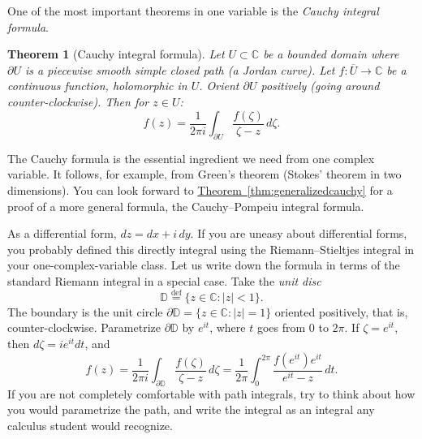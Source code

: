 \documentclass[12pt,openany]{book}
\newcommand{\sabs}[1]{\lvert {#1} \rvert}
\newcommand{\C}{{\mathbb{C}}}
\newcommand{\D}{{\mathbb{D}}}
\newcommand{\myindex}[1]{#1\index{#1}}
\theoremstyle{plain}
\newtheorem{thm}{Theorem}[section]
\theoremstyle{remark}
\theoremstyle{definition}
\theoremstyle{exercise}
\theoremstyle{example}
\newcommand{\thmref}[1]{\hyperref[#1]{Theorem~\ref*{#1}}}
\begin{document}
One of the most important theorems in one variable is
the \emph{\myindex{Cauchy integral formula}}.

\begin{thm}[Cauchy integral formula]
Let $U \subset \C$ be a bounded domain where $\partial U$ is a piecewise smooth
simple closed path (a Jordan curve).  Let $f \colon \overline{U} \to \C$ be a continuous function,
holomorphic in $U$.
Orient $\partial U$ positively (going around counter-clockwise).
Then for $z \in U$:
\begin{equation*}
f(z) =
\frac{1}{2\pi i}
\int_{\partial U}
\frac{f(\zeta)}{\zeta-z}
\,
d \zeta .
\end{equation*}
\end{thm}


The Cauchy formula is the essential ingredient we need from 
one complex variable.  It follows, for example,
from Green's theorem (Stokes' theorem in two
dimensions).  You can look forward to
\thmref{thm:generalizedcauchy} for a proof of a more general formula,
the Cauchy--Pompeiu integral formula.

As a differential form,  $dz = dx + i \, dy$.  If you are uneasy
about differential forms, you probably defined this directly integral using
the Riemann--Stieltjes integral in your one-complex-variable class.
Let us write down the formula in terms of the standard Riemann integral
in a special case.  Take the \emph{\myindex{unit disc}}
\begin{equation*}
\D
\overset{\text{def}}{=}
\bigl\{ z \in \C : \sabs{z} < 1 \bigr\} .
\end{equation*}
The boundary is the unit circle
$\partial \D = \bigl\{ z \in \C : \sabs{z} = 1 \bigr\}$ oriented positively,
that is, counter-clockwise.   Parametrize $\partial \D$
by $e^{it}$, where $t$ goes from 0 to $2\pi$.  If $\zeta = e^{it}$,
then $d\zeta = ie^{it}dt$, and
\begin{equation*}
f(z) =
\frac{1}{2\pi i}
\int_{\partial \D}
\frac{f(\zeta)}{\zeta-z}
\,
d \zeta 
=
\frac{1}{2\pi}
\int_0^{2\pi}
\frac{f(e^{it}) e^{it} }{e^{it}-z}
\,
dt .
\end{equation*}
If you are not completely comfortable
with
path %
integrals, try to think about how you would parametrize the path, and
write the integral as an integral any calculus student would recognize.
\end{document}
